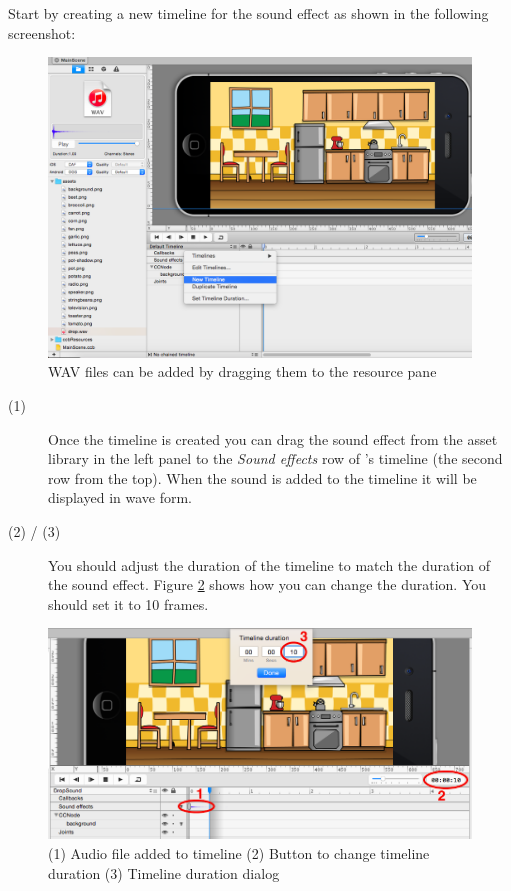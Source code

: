 \begin{leftbar}
Start by creating a new timeline for the sound effect as shown in the following
screenshot: 

\begin{figure}[H]
    \centering
    \includegraphics[width=0.9\linewidth]{images/Chapter2/new_timeline_audio.png}
    \caption{WAV files can be added by dragging them to the resource
    pane}\label{fig:audio_new_timeline}
\end{figure}

\begin{description}
\item[(1)] Once the timeline is created you can drag the
sound effect from the asset library in the left panel to the \textit{Sound
effects} row of \SB{}'s timeline (the second row from the top). When the sound
is added to the timeline it will be displayed in wave form.
\item[(2) / (3)] You should adjust the duration of the timeline to match the
duration of the sound effect. Figure \ref{fig:change_timeline_duration} shows how you can change the
duration. You should set it to 10 frames.
\end{description}

\begin{figure}[H]
    \centering
    \includegraphics[width=0.9\linewidth]{images/Chapter2/audio_timeline.png}
    \caption{(1) Audio file added to timeline\newline{} (2)
    Button to change timeline duration\newline{} (3) Timeline
    duration dialog\newline{}}\label{fig:change_timeline_duration}
\end{figure}

\end{leftbar}

